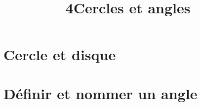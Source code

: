\documentclass[12pt,a4paper]{article}
\date{}
\title{\textcircled{{\normalsize{4}}}Cercles et angles}
\begin{document}
	
	\maketitle



\section{Cercle et disque }



\section{Définir et nommer un angle}



%
%
%
%
%
\end{document}

